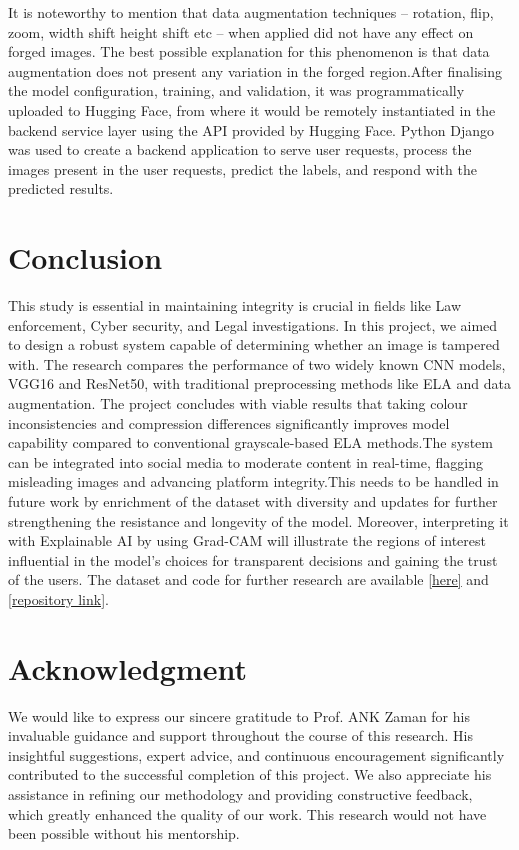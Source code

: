 \documentclass{ieeeaccess}
\begin{document}
 
 It is noteworthy to mention that data augmentation techniques – rotation, flip, zoom, width shift height shift etc – when applied did not have any effect on forged images. The best possible explanation for this phenomenon is that data augmentation does not present any variation in the forged region.After finalising the model configuration, training, and validation, it was programmatically uploaded to Hugging Face, from where it would be remotely instantiated in the backend service layer using the API provided by Hugging Face. Python Django was used to create a backend application to serve user requests, process the images present in the user requests, predict the labels, and respond with the predicted results.
  


\section{Conclusion}
This study is essential in maintaining integrity is crucial in fields like Law enforcement, Cyber security, and Legal investigations. In this project, we aimed to design a robust system capable of determining whether an image is tampered with. The research compares the performance of two widely known CNN models, VGG16 and ResNet50, with traditional preprocessing methods like ELA and data augmentation. The project concludes with viable results that taking colour inconsistencies and compression differences significantly improves model capability compared to conventional grayscale-based ELA methods.The system can be integrated into social media to moderate content in real-time, flagging misleading images and advancing platform integrity.This needs to be handled in future work by enrichment of the dataset with diversity and updates for further strengthening the resistance and longevity of the model. Moreover, interpreting it with Explainable AI by using Grad-CAM will illustrate the regions of interest influential in the model's choices for transparent decisions and gaining the trust of the users.
The dataset and code for further research are available \href{https://www.kaggle.com/datasets/divg07/casia-20-image-tampering-detection-dataset/data}{[here]} and \href{https://github.com/ayaz168/veriforge}{[repository link]}.

\section*{Acknowledgment}
We would like to express our sincere gratitude to Prof. ANK Zaman for his invaluable guidance and support throughout the course of this research. His insightful suggestions, expert advice, and continuous encouragement significantly contributed to the successful completion of this project. We also appreciate his assistance in refining our methodology and providing constructive feedback, which greatly enhanced the quality of our work. This research would not have been possible without his mentorship.
\end{document}

